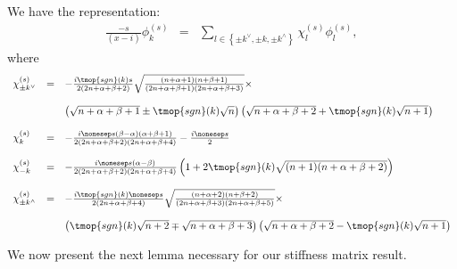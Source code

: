 \begin{lemma}
  \label{lemma:stiff1}We have the representation:
  \[ \begin{array}{lll}
       \frac{- s}{(x - i)} \phi^{(s)}_k & = & \sum_{l \in \left\{ \pm
       k^{\vee}, \pm k, \pm k^{\wedge} \right\}} \chi_l^{(s)} \phi_l^{(s)},
     \end{array} \]
  where
  \[ \begin{array}{lll}
       \chi^{(s)}_{\pm k^{\vee}} & = & - \frac{i \tmop{sgn} (k) s}{2 (2 n +
       \alpha + \beta + 2)} \sqrt{\frac{(n + \alpha + 1) (n + \beta + 1)}{(2 n
       + \alpha + \beta + 1) (2 n + \alpha + \beta + 3)}} \times\\
       &  & \\
       &  & \left( \sqrt{n + \alpha + \beta + 1} \pm \tmop{sgn} (k) \sqrt{n}
       \right) \left( \sqrt{n + \alpha + \beta + 2} + \tmop{sgn} (k) \sqrt{n +
       1} \right)\\
       &  & \\
       \chi_k^{(s)} & = & - \frac{i \nonesep s (\beta - \alpha) (\alpha +
       \beta + 1)}{2 (2 n + \alpha + \beta + 2) (2 n + \alpha + \beta + 4)} -
       \frac{i \nonesep s}{2}\\
       &  & \\
       \chi_{- k}^{(s)} & = & - \frac{i \nonesep s (\alpha - \beta)}{2 (2 n +
       \alpha + \beta + 2) (2 n + \alpha + \beta + 4)} \left( 1 + 2 \tmop{sgn}
       (k) \sqrt{(n + 1) (n + \alpha + \beta + 2)} \right)\\
       &  & \\
       \chi_{\pm k^{\wedge}}^{(s)} & = & - \frac{i \tmop{sgn} (k) \nonesep
       s}{2 (2 n + \alpha + \beta + 4)} \sqrt{\frac{(n + \alpha + 2) (n +
       \beta + 2)}{(2 n + \alpha + \beta + 3) (2 n + \alpha + \beta + 5)}}
       \times\\
       &  & \\
       &  & \left( \tmop{sgn} (k) \sqrt{n + 2} \mp \sqrt{n + \alpha + \beta +
       3} \right)  \left( \sqrt{n + \alpha + \beta + 2} - \tmop{sgn} (k)
       \sqrt{n + 1} \right)
     \end{array} \]
\end{lemma}

We now present the next lemma necessary for our stiffness matrix result.

